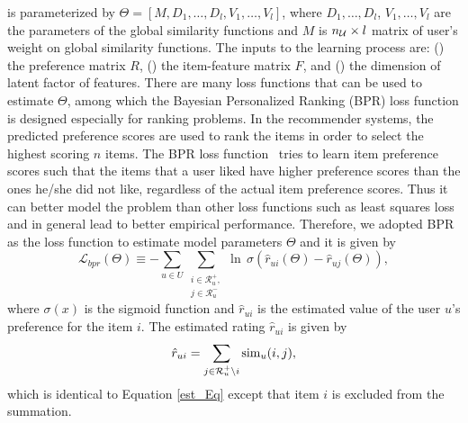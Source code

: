 \CF is parameterized by $\Theta=[M, D_1, \ldots , D_l, V_1, \ldots ,V_l ]$, where
$D_1, \ldots, D_l$, $V_1, \ldots, V_l$ are the parameters of the
global similarity functions and $M$ is $n_{\cal U} \times l$ matrix of user's weight on
global similarity functions. The inputs to the
learning process are: ({}) the preference matrix ${R}$,
({}) the item-feature matrix ${F}$, and ({}) the
dimension of latent factor of features. There are many loss functions that can
be used to estimate $\Theta$, among which the Bayesian Personalized Ranking
(BPR) loss function \cite{rendle2009bpr} is designed especially for ranking problems.
In the \TOPN recommender systems, the predicted preference scores are used
to rank the items in order to select the highest scoring $n$ items. 
The BPR loss function~\cite{rendle2009bpr,gantner10} tries to learn item preference scores such that the 
items that a user liked have higher preference scores than the ones he/she 
did not like, regardless of the actual item preference scores. 
Thus it can better model the problem than other loss functions
such as least squares loss and in general lead to better empirical
performance. Therefore, we adopted BPR as the loss function to
estimate model parameters $\Theta$ and it is given by
%
\begin{equation}\label{eq_bpr}
\mathcal{L}_{bpr}(\Theta) \equiv - \sum_{u \in U} \sum_{\substack{i \in \mathcal{R}_u^+ ,\\  j \in \mathcal{R}_u^-}}  \ln \, \sigma(\hat{r}_{ui}(\Theta) - \hat{r}_{uj}(\Theta) ),
\end{equation}
%
where $\sigma(x)$ is the sigmoid function and $\hat{r}_{ui}$ is the 
estimated value of the user $u$'s preference for the item $i$. The estimated
rating $\hat{r}_{ui}$ is given by
%
\begin{equation} \label{eq_est_true}
\hat{r}_{ui} = \sum_{ j \in \mathcal{R}_u^+\backslash i} \operatorname{sim}_{u}(i,j),
\end{equation}
%
which is identical to Equation \ref{est_Eq} except that item $i$ is excluded from the summation. 

